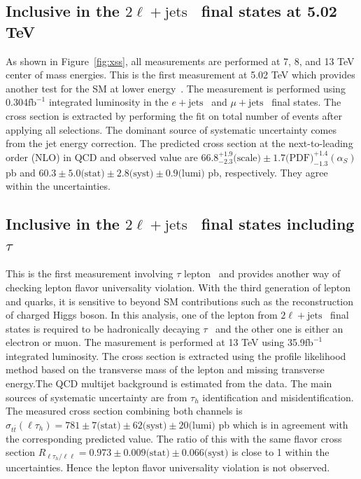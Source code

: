 \documentclass[submission, Proceedings]{SciPost}
\newcommand{\fbinv}{\ensuremath{{\text{fb}^{-1}}}{}}
\newcommand{\Pe}{\ensuremath{{e}}}
\newcommand{\PQt}{\ensuremath{{t}}}
\newcommand{\PAQt}{\ensuremath{{\bar{t}}}}
\newcommand{\ttbar}{{\PQt\PAQt}}
\newcommand{\PQtau}{\ensuremath{{\tau}}}
\newcommand{\dilep}{\ensuremath{2\ell + \text{jets}}}
\newcommand{\mujets}{\ensuremath{\mu + \text{jets}}}
\newcommand{\ejets}{\ensuremath{\Pe + \text{jets}}}
\begin{document}
\subsection{Inclusive in the \dilep~ final states at 5.02 TeV}
As shown in Figure~\ref{fig:xss}, all measurements are performed at 7, 8, and 13 TeV center of
mass energies. This is the first measurement at 5.02 TeV which provides another test for the 
SM at lower energy~\cite{CMS-PAS-TOP-20-004}. The measurement is performed using 0.304\fbinv 
integrated luminosity in the \ejets~ and \mujets~ final states. The cross section is extracted 
by performing the fit on total number of events after applying all selections. The dominant source 
of systematic uncertainty comes from the jet energy correction. The predicted cross section at the
next-to-leading order (NLO) in QCD and observed value are 
$66.8^{+1.9}_{-2.3}\text{(scale)}\pm 1.7\text{(PDF)}^{+1.4}_{-1.3}(\alpha_S)$ pb and 
$60.3 \pm 5.0 \text{(stat)} \pm 2.8 \text{(syst)} \pm 0.9 \text{(lumi)}$ pb, respectively. They
agree within the uncertainties. 

\subsection{Inclusive in the \dilep~ final states including $\PQtau$}
This is the first measurement involving $\tau$ lepton~\cite{CMS:2019snc} and provides another 
way of checking lepton flavor universality violation. With the third generation of lepton and quarks,
it is sensitive to beyond SM contributions such as the reconstruction of charged Higgs boson. In 
this analysis, one of the lepton from \dilep~ final states is required to be hadronically decaying 
\PQtau~ and the other one is either an electron or muon. The masurement is performed at 13 TeV 
using 35.9\fbinv integrated luminosity. The cross section is extracted using the profile 
likelihood method based on the transverse mass of the lepton and missing transverse energy.The  
QCD multijet background is estimated from the data. The main sources of systematic uncertainty are 
from $\tau_h$ identification and misidentification. The measured cross section combining both channels 
is  
$\sigma_\ttbar(\ell\tau_h) = 781 \pm 7 \text{(stat)} \pm 62 \text{(syst)} \pm 20 \text{(lumi)}$ pb
which is in agreement with the corresponding predicted value. The ratio of this with the same 
flavor cross section 
$R_{\ell\tau_h/\ell\ell} = 0.973 \pm 0.009 \text{(stat)} \pm 0.066 \text{(syst)}$ is close to 1 
within the uncertainties. Hence the lepton flavor universality violation is not observed.
\end{document}
